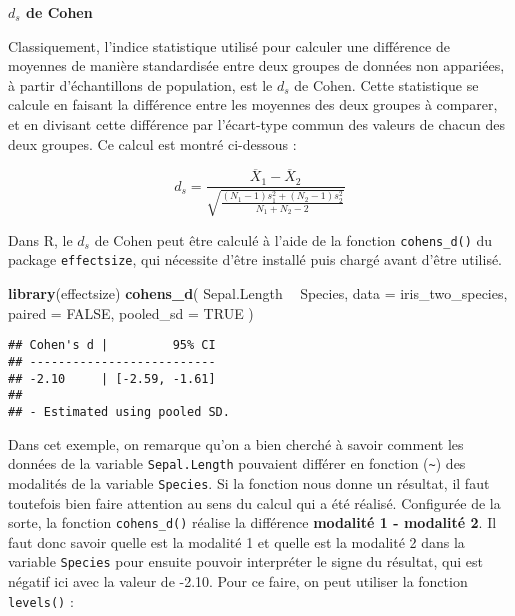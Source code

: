 \documentclass[
  french,
]{book}
\newenvironment{Shaded}{\begin{snugshade}}{\end{snugshade}}
\newcommand{\DataTypeTok}[1]{\textcolor[rgb]{0.13,0.29,0.53}{#1}}
\newcommand{\KeywordTok}[1]{\textcolor[rgb]{0.13,0.29,0.53}{\textbf{#1}}}
\newcommand{\NormalTok}[1]{#1}
\newcommand{\OperatorTok}[1]{\textcolor[rgb]{0.81,0.36,0.00}{\textbf{#1}}}
\newcommand{\OtherTok}[1]{\textcolor[rgb]{0.56,0.35,0.01}{#1}}
\newcommand{\StringTok}[1]{\textcolor[rgb]{0.31,0.60,0.02}{#1}}
\begin{document}
\textbf{\(d_{s}\) de Cohen}

Classiquement, l'indice statistique utilisé pour calculer une différence de moyennes de manière standardisée entre deux groupes de données non appariées, à partir d'échantillons de population, est le \(d_{s}\) de Cohen. Cette statistique se calcule en faisant la différence entre les moyennes des deux groupes à comparer, et en divisant cette différence par l'écart-type commun des valeurs de chacun des deux groupes. Ce calcul est montré ci-dessous :

\[d_{s} = \frac{\overline{X}_{1} - \overline{X}_{2}} {\sqrt{\frac{(N_{1} - 1) s_{1}^2 + (N_{2} - 1) s_{2}^2} {N_{1} + N_{2} - 2}}}\]

Dans R, le \(d_{s}\) de Cohen peut être calculé à l'aide de la fonction \texttt{cohens\_d()} du package \texttt{effectsize}, qui nécessite d'être installé puis chargé avant d'être utilisé.

\begin{Shaded}
\begin{Highlighting}[]
\KeywordTok{library}\NormalTok{(effectsize)}
\KeywordTok{cohens_d}\NormalTok{(}
\NormalTok{  Sepal.Length }\OperatorTok{~}\StringTok{ }\NormalTok{Species, }
  \DataTypeTok{data =}\NormalTok{ iris_two_species, }
  \DataTypeTok{paired =} \OtherTok{FALSE}\NormalTok{, }
  \DataTypeTok{pooled_sd =} \OtherTok{TRUE}
\NormalTok{  )}
\end{Highlighting}
\end{Shaded}

\begin{verbatim}
## Cohen's d |         95% CI
## --------------------------
## -2.10     | [-2.59, -1.61]
## 
## - Estimated using pooled SD.
\end{verbatim}

Dans cet exemple, on remarque qu'on a bien cherché à savoir comment les données de la variable \texttt{Sepal.Length} pouvaient différer en fonction (\texttt{\textasciitilde{}}) des modalités de la variable \texttt{Species}. Si la fonction nous donne un résultat, il faut toutefois bien faire attention au sens du calcul qui a été réalisé. Configurée de la sorte, la fonction \texttt{cohens\_d()} réalise la différence \textbf{modalité 1 - modalité 2}. Il faut donc savoir quelle est la modalité 1 et quelle est la modalité 2 dans la variable \texttt{Species} pour ensuite pouvoir interpréter le signe du résultat, qui est négatif ici avec la valeur de -2.10. Pour ce faire, on peut utiliser la fonction \texttt{levels()} :
\end{document}
